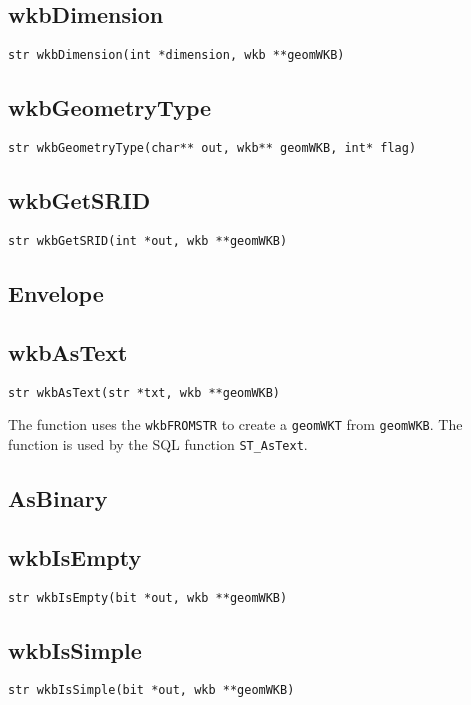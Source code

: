 \documentclass{article}
\begin{document}
\subsection{wkbDimension}

{\tt str wkbDimension(int *dimension, wkb **geomWKB)}

\subsection{wkbGeometryType}

{\tt str wkbGeometryType(char** out, wkb** geomWKB, int* flag)}

\subsection{wkbGetSRID}

{\tt str wkbGetSRID(int *out, wkb **geomWKB)}

\subsection{Envelope}

\subsection{wkbAsText}

{\tt str wkbAsText(str *txt, wkb **geomWKB)}

\vspace{10pt}
\noindent
The function uses the {\tt wkbFROMSTR} to create a {\tt geomWKT} from {\tt geomWKB}.
The function is used by the SQL function {\tt ST\_AsText}.

\subsection{AsBinary}

\subsection{wkbIsEmpty}

{\tt str wkbIsEmpty(bit *out, wkb **geomWKB)}

\subsection{wkbIsSimple}

{\tt str wkbIsSimple(bit *out, wkb **geomWKB)}
\end{document}
